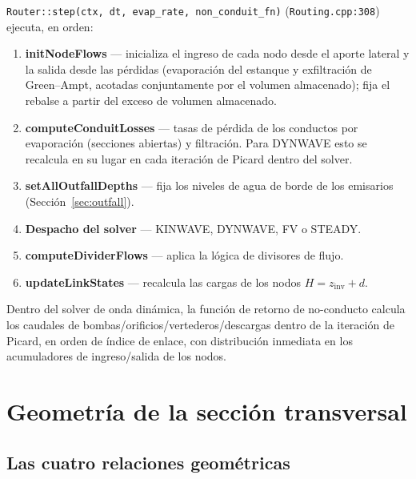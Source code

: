 \documentclass[11pt,a4paper]{article}
\begin{document}
\texttt{Router::step(ctx, dt, evap\_rate, non\_conduit\_fn)}
(\texttt{Routing.cpp:308}) ejecuta, en orden:
\begin{enumerate}[nosep]
  \item \textbf{initNodeFlows} --- inicializa el ingreso de cada nodo desde el
        aporte lateral y la salida desde las pérdidas (evaporación del estanque
        y exfiltración de Green--Ampt, acotadas conjuntamente por el volumen
        almacenado); fija el rebalse a partir del exceso de volumen almacenado.
  \item \textbf{computeConduitLosses} --- tasas de pérdida de los conductos por
        evaporación (secciones abiertas) y filtración. Para DYNWAVE esto se
        recalcula en su lugar en cada iteración de Picard dentro del solver.
  \item \textbf{setAllOutfallDepths} --- fija los niveles de agua de borde de
        los emisarios (Sección~\ref{sec:outfall}).
  \item \textbf{Despacho del solver} --- KINWAVE, DYNWAVE, FV o STEADY.
  \item \textbf{computeDividerFlows} --- aplica la lógica de divisores de
        flujo.
  \item \textbf{updateLinkStates} --- recalcula las cargas de los nodos
        $H = z_{\mathrm{inv}} + d$.
\end{enumerate}

Dentro del solver de onda dinámica, la función de retorno de no-conducto
calcula los caudales de bombas/orificios/vertederos/descargas dentro de la
iteración de Picard, en orden de índice de enlace, con distribución inmediata
en los acumuladores de ingreso/salida de los nodos.

\section{Geometría de la sección transversal}
\label{sec:xsect}

\subsection{Las cuatro relaciones geométricas}
\end{document}
